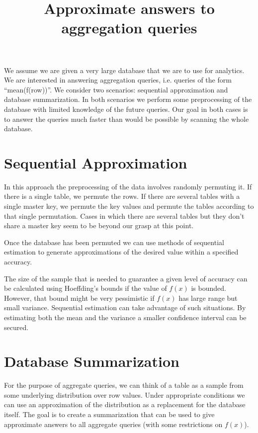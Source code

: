 \documentclass[11pt]{article}
\title{Approximate answers to aggregation queries}
\begin{document}
\maketitle

We assume we are given a very large database that we are to use for
analytics. We are interested in answering aggregation queries,
i.e. queries of the form ``mean(f(row))''. We consider two scenarios:
sequential approximation and database summarization. In both scenarios
we perform some preprocessing of the database with limited knowledge
of the future queries. Our goal in both cases is to answer the queries
much faster than would be possible by scanning the whole database.

\section{Sequential Approximation}
In this approach the preprocessing of the data involves randomly
permuting it. If there is a single table, we permute the rows. If
there are several tables with a single master key, we permute the key
values and permute the tables according to that single
permutation. Cases in which there are several tables but they don't
share a master key seem to be beyond our grasp at this point.

Once the database has been permuted we can use methods of sequential
estimation to generate approximations of the desired value within a
specified accuracy. 

The size of the sample that is needed to guarantee a given level of
accuracy can be calculated using Hoeffding's bounds if the value of
$f(x)$ is bounded. However, that bound might be very pessimistic if
$f(x)$ has large range but small variance. Sequential estimation can
take advantage of such situations. By estimating both the mean and the
variance a smaller confidence interval can be secured.

\section{Database Summarization}

For the purpose of aggregate queries, we can think of a table as a
sample from some underlying distribution over row values. Under
appropriate conditions we can use an approximation of the distribution
as a replacement for the database itself. The goal is to create a
summarization that can be used to give approximate answers to 
all aggregate queries (with some restrictions on $f(x)$).
\end{document}
